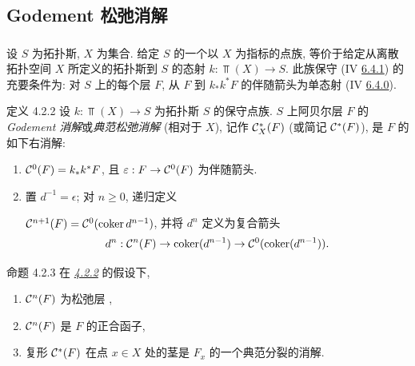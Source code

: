 \subsection{Godement 松弛消解}\pageoriginale

\subsubsection{}
设 $S$ 为拓扑斯, $X$ 为集合. 给定 $S$ 的一个以 $X$ 为指标的点族\sisi{}{}, 等价于给定从离散拓扑空间 $X$ 所定义的拓扑斯到 $S$ 的态射 $k:\Top(X)\rightarrow S$. 此族保守 (IV \hyperref[IV.def6.4.1]{6.4.1}) 的充要条件为: 对 $S$ 上的每个层 $F$, 从 $F$ 到 $k_{\ast}k^{\ast}F$ 的伴随箭头为单态射 (\cf IV \hyperref[IV.subsubsec6.4.0]{6.4.0}).

\begin{enonce*}{定义 4.2.2}
设 $k:\Top(X)\rightarrow S$ 为拓扑斯 $S$ 的保守点族. $S$ 上阿贝尔层 $F$ 的 \emph{Godement 消解}或\emph{典范松弛消解} (相对于 $X$), 记作 ${\mathcal C}_X^{\ast}(F)$ (或简记 ${\mathcal C}^{\ast}(F)$), 是 $F$ 的如下右消解:
\begin{enumerate}
\renewcommand{\labelenumi}{\theenumi)}
\item ${\mathcal C}^{0}(F)=k_{\ast}k^{\ast}F$, 且 $\varepsilon:F\rightarrow{\mathcal C}^{0}(F)$ 为伴随箭头.

\item 置 $d^{-1}=\epsilon$; 对 $n\geq0$, 递归定义

${\mathcal C}^{n+1}(F)={\mathcal C}^{0}(\operatorname{coker} d^{n-1})$, 并将 $d^n$ 定义为复合箭头
\[
d^{n}:{\mathcal C}^n(F)\rightarrow
\operatorname{coker}(d^{n-1})\rightarrow{\mathcal C}^{0}(\operatorname{coker}(d^{n-1})){}.
\]
\end{enumerate}
\end{enonce*}

\begin{enonce*}{命题 4.2.3}
在 \emph{\hyperref[XVII.def4.2.2]{4.2.2}} 的假设下,
\begin{enumerate}
\renewcommand{\theenumi}{\roman{enumi}}
\renewcommand{\labelenumi}{(\theenumi)}
\item ${\mathcal C}^n(F)$ 为松弛层 \emph{},

\item ${\mathcal C}^n(F)$ 是 $F$ 的正合函子,

\item 复形 ${\mathcal C}^{\ast}(F)$ 在点 $x\in X$ 处的茎是 $F_x$ 的一个典范分裂的消解.
\end{enumerate}
\end{enonce*}

